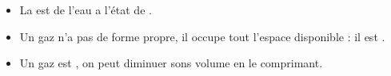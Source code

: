 \begin{mybilan}
	\begin{itemize}
		\item La  est de l'eau a l'état de .
		\item Un gaz n'a pas de forme propre, il occupe tout l'espace disponible : il est .
		\item Un gaz est , on peut diminuer sons volume en le comprimant.	
	\end{itemize}	  
\end{mybilan}